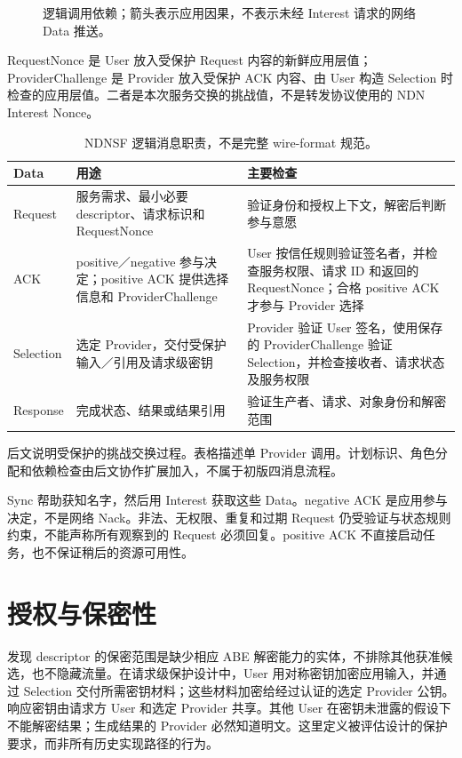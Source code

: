 \begin{figure}[htbp]
\centering\resizebox{\linewidth}{!}{}
\caption{逻辑调用依赖；箭头表示应用因果，不表示未经 Interest 请求的网络 Data 推送。}
\end{figure}
RequestNonce 是 User 放入受保护 Request 内容的新鲜应用层值；ProviderChallenge 是 Provider 放入受保护 ACK 内容、由 User 构造 Selection 时检查的应用层值。二者是本次服务交换的挑战值，不是转发协议使用的 NDN Interest Nonce。
\begin{table}[htbp]\centering\small
\caption{NDNSF 逻辑消息职责，不是完整 wire-format 规范。}
\begin{tabularx}{\textwidth}{p{}XX}
\toprule Data & 用途 & 主要检查\\\midrule
Request & 服务需求、最小必要 descriptor、请求标识和 RequestNonce & 验证身份和授权上下文，解密后判断参与意愿\\\midrule
ACK & positive／negative 参与决定；positive ACK 提供选择信息和 ProviderChallenge & User 按信任规则验证签名者，并检查服务权限、请求 ID 和返回的 RequestNonce；合格 positive ACK 才参与 Provider 选择\\\midrule
Selection & 选定 Provider，交付受保护输入／引用及请求级密钥 & Provider 验证 User 签名，使用保存的 ProviderChallenge 验证 Selection，并检查接收者、请求状态及服务权限\\\midrule
Response & 完成状态、结果或结果引用 & 验证生产者、请求、对象身份和解密范围\\\bottomrule
\end{tabularx}\end{table}

后文说明受保护的挑战交换过程。表格描述单 Provider 调用。计划标识、角色分配和依赖检查由后文协作扩展加入，不属于初版四消息流程。

Sync 帮助获知名字，然后用 Interest 获取这些 Data。negative ACK 是应用参与决定，不是网络 Nack。非法、无权限、重复和过期 Request 仍受验证与状态规则约束，不能声称所有观察到的 Request 必须回复。positive ACK 不直接启动任务，也不保证稍后的资源可用性。

\section{授权与保密性}

发现 descriptor 的保密范围是缺少相应 ABE 解密能力的实体，不排除其他获准候选，也不隐藏流量。在请求级保护设计中，User 用对称密钥加密应用输入，并通过 Selection 交付所需密钥材料；这些材料加密给经过认证的选定 Provider 公钥。响应密钥由请求方 User 和选定 Provider 共享。其他 User 在密钥未泄露的假设下不能解密结果；生成结果的 Provider 必然知道明文。这里定义被评估设计的保护要求，而非所有历史实现路径的行为。

